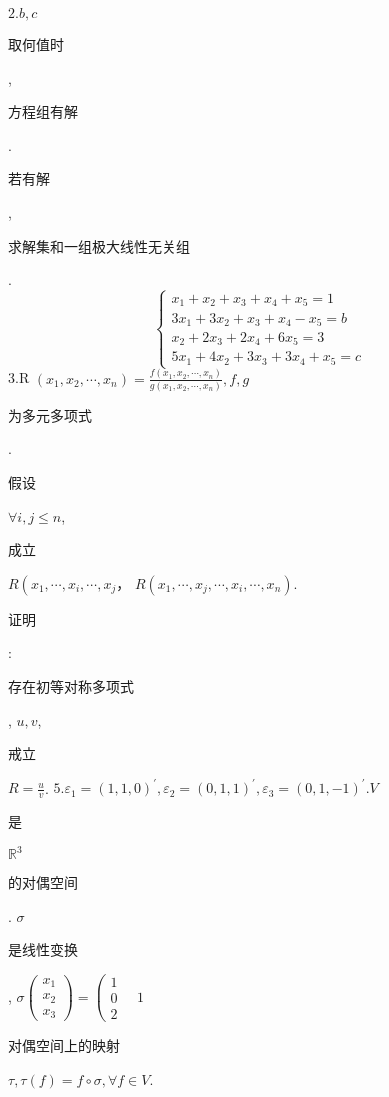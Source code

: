 \documentclass[10pt]{article}
\begin{document}
$2 . b, c$ \begin{CJK}{UTF8}{mj}取何值时\end{CJK}, \begin{CJK}{UTF8}{mj}方程组有解\end{CJK}. \begin{CJK}{UTF8}{mj}若有解\end{CJK}, \begin{CJK}{UTF8}{mj}求解集和一组极大线性无关组\end{CJK}.
$$
\left\{\begin{array}{l}
x_{1}+x_{2}+x_{3}+x_{4}+x_{5}=1 \\
3 x_{1}+3 x_{2}+x_{3}+x_{4}-x_{5}=b \\
x_{2}+2 x_{3}+2 x_{4}+6 x_{5}=3 \\
5 x_{1}+4 x_{2}+3 x_{3}+3 x_{4}+x_{5}=c
\end{array}\right.
$$
3.R $\left(x_{1}, x_{2}, \cdots, x_{n}\right)=\frac{f\left(x_{1}, x_{2}, \cdots, x_{n}\right)}{g\left(x_{1}, x_{2}, \cdots, x_{n}\right)}, f, g$ \begin{CJK}{UTF8}{mj}为多元多项式\end{CJK}.\begin{CJK}{UTF8}{mj}假设\end{CJK} $\forall i, j \leq n$, \begin{CJK}{UTF8}{mj}成立\end{CJK} $R\left(x_{1}, \cdots, x_{i}, \cdots, x_{j} ，\right.$ $R\left(x_{1}, \cdots, x_{j}, \cdots, x_{i}, \cdots, x_{n}\right)$. \begin{CJK}{UTF8}{mj}证明\end{CJK}:\begin{CJK}{UTF8}{mj}存在初等对称多项式\end{CJK}, $u, v$, \begin{CJK}{UTF8}{mj}戒立\end{CJK} $R=\frac{u}{v}$. $5 . \varepsilon_{1}=(1,1,0)^{\prime}, \varepsilon_{2}=(0,1,1)^{\prime}, \varepsilon_{3}=(0,1,-1)^{\prime} . V$ \begin{CJK}{UTF8}{mj}是\end{CJK} $\mathbb{R}^{3}$ \begin{CJK}{UTF8}{mj}的对偶空间\end{CJK}. $\sigma$ \begin{CJK}{UTF8}{mj}是线性变换\end{CJK}, $\sigma\left(\begin{array}{l}x_{1} \\ x_{2} \\ x_{3}\end{array}\right)=\left(\begin{array}{l}1 \\ 0 \\ 2\end{array} \quad 1\right.$ \begin{CJK}{UTF8}{mj}对偶空间上的映射\end{CJK} $\tau, \tau(f)=f \circ \sigma, \forall f \in V$.
\end{document}
